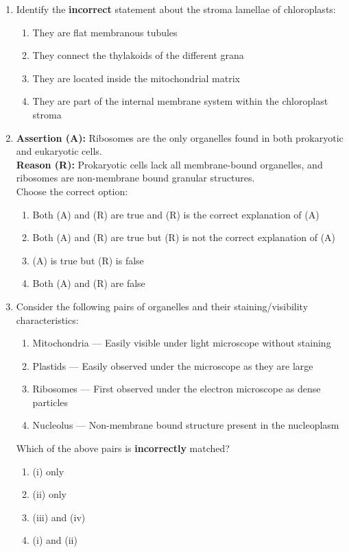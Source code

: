 \documentclass[11pt, a4paper]{article}
\begin{document}
\begin{enumerate}[label=\textbf{\arabic*.}, leftmargin=*, itemsep=8pt]
    \item Identify the \textbf{incorrect} statement about the stroma lamellae of chloroplasts:
    \begin{enumerate}[label=(\alph*)]
        \item They are flat membranous tubules
        \item They connect the thylakoids of the different grana
        \item They are located inside the mitochondrial matrix
        \item They are part of the internal membrane system within the chloroplast stroma
    \end{enumerate}

    \item \textbf{Assertion (A):} Ribosomes are the only organelles found in both prokaryotic and eukaryotic cells.\\
    \textbf{Reason (R):} Prokaryotic cells lack all membrane-bound organelles, and ribosomes are non-membrane bound granular structures.\\
    Choose the correct option:
    \begin{enumerate}[label=(\alph*)]
        \item Both (A) and (R) are true and (R) is the correct explanation of (A)
        \item Both (A) and (R) are true but (R) is not the correct explanation of (A)
        \item (A) is true but (R) is false
        \item Both (A) and (R) are false
    \end{enumerate}

    \item Consider the following pairs of organelles and their staining/visibility characteristics:
    \begin{enumerate}[label=(\roman*)]
        \item Mitochondria — Easily visible under light microscope without staining
        \item Plastids — Easily observed under the microscope as they are large
        \item Ribosomes — First observed under the electron microscope as dense particles
        \item Nucleolus — Non-membrane bound structure present in the nucleoplasm
    \end{enumerate}
    Which of the above pairs is \textbf{incorrectly} matched?
    \begin{enumerate}[label=(\alph*)]
        \item (i) only
        \item (ii) only
        \item (iii) and (iv)
        \item (i) and (ii)
    \end{enumerate}


\end{enumerate}
\end{document}
